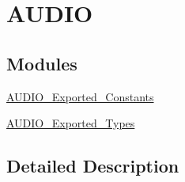 \hypertarget{group___a_u_d_i_o}{}\section{A\+U\+D\+IO}
\label{group___a_u_d_i_o}
\subsection*{Modules}
\begin{DoxyCompactItemize}
\item 
\mbox{\hyperlink{group___a_u_d_i_o___exported___constants}{A\+U\+D\+I\+O\+\_\+\+Exported\+\_\+\+Constants}}
\item 
\mbox{\hyperlink{group___a_u_d_i_o___exported___types}{A\+U\+D\+I\+O\+\_\+\+Exported\+\_\+\+Types}}
\end{DoxyCompactItemize}


\subsection{Detailed Description}
